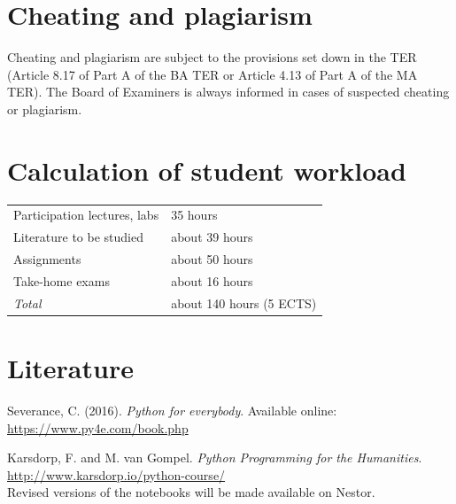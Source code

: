 \documentclass[a4paper,12pt]{article}
\begin{document}
\section{Cheating and plagiarism}
Cheating and plagiarism are subject to the provisions set down in the TER
(Article 8.17 of Part A of the BA TER or Article 4.13 of Part A of the MA TER).
The Board of Examiners is always informed in cases of suspected cheating or
plagiarism.

\section{Calculation of student workload}
\begin{tabular}{ll}
    Participation lectures, labs   & 35 hours \\
    Literature to be studied       & about 39 hours \\
    Assignments                    & about 50 hours \\
    Take-home exams                & about 16 hours \\
    \emph{Total}                   & about 140 hours (5 ECTS) \\
\end{tabular}

\section{Literature}
Severance, C. (2016). \emph{Python for everybody}.
Available online: \url{https://www.py4e.com/book.php}

Karsdorp, F. and M. van Gompel. \emph{Python Programming for the Humanities}.
\url{http://www.karsdorp.io/python-course/} \\
Revised versions of the notebooks will be made available on Nestor.

%
%
\end{document}
